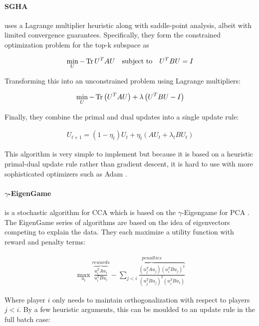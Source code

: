 \paragraph{SGHA} uses a Lagrange multiplier heuristic along with saddle-point analysis, albeit with limited convergence guarantees.
Specifically, they form the constrained optimization problem for the top-k subspace as

\begin{align}
    \min_{U} -\operatorname{Tr} U^T A U \quad \text{subject to} \quad U^T B U = I
\end{align}

Transforming this into an unconstrained problem using Lagrange multipliers:

\begin{align}
    \min_{U} -\operatorname{Tr}\left(U^T A U \right) + \lambda \left(U^T B U - I\right)
\end{align}

Finally, they combine the primal and dual updates into a single update rule:

\begin{align}
    U_{t+1} = \left(1 - \eta_t\right) U_t + \eta_t \left(A U_t + \lambda_t B U_t\right)
\end{align}

This algorithm is very simple to implement but because it is based on a heuristic primal-dual update rule rather than gradient descent, it is hard to use with more sophisticated optimizers such as Adam \citep{kingma2014adam}.

\paragraph{$\gamma$-EigenGame} is a stochastic algorithm for CCA which is based on the $\gamma$-Eigengame for PCA \citep{gemp20}.
The EigenGame series of algorithms are based on the idea of eigenvectors competing to explain the data.
They each maximize a utility function with reward and penalty terms:

\begin{align}
    \max_{u_i} \overbrace{\frac{u_i^TAu_i}{u_i^TBu_i}}^{rewards} - \overbrace{\sum_{j < i} \frac{(u_j^TAu_j)(u_i^TBu_j)^2}{(u_j^TBu_j)^2(u_i^TBu_i)}}^{penalties}
\end{align}

Where player $i$ only needs to maintain orthogonalization with respect to players $j < i$.
By a few heuristic arguments, this can be moulded to an update rule in the full batch case:


